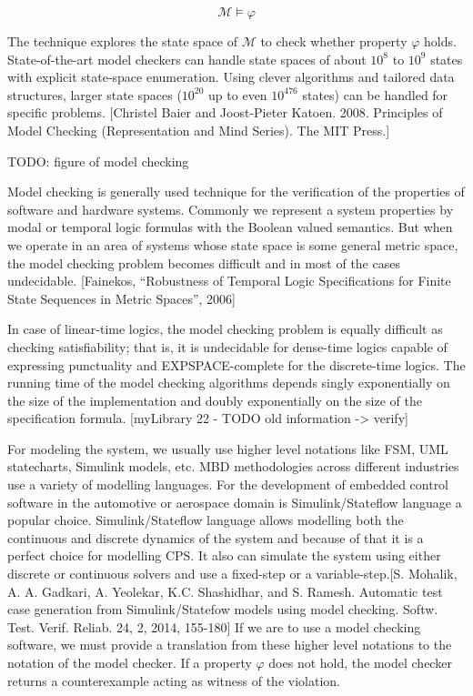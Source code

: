 \begin{equation}
	\mathcal{M} \models \varphi
\end{equation}

The technique explores the state space of $\mathcal{M}$ to check whether property $\varphi$ holds. State-of-the-art model checkers can handle state spaces of about $10^8$ to $10^9$ states with explicit state-space enumeration. Using clever algorithms and tailored data structures, larger state spaces ($10^{20}$ up to even $10^{476}$ states) can be handled for specific problems. [Christel Baier and Joost-Pieter Katoen. 2008. Principles of Model Checking (Representation and Mind Series). The MIT Press.]

TODO: figure of model checking

Model checking is generally used technique for the verification of the properties of software and hardware systems. Commonly we represent a system properties by modal or temporal logic formulas with the Boolean valued semantics. But when we operate in an area of systems whose state space is some general metric space, the model checking problem becomes difficult and in most of the cases undecidable. [Fainekos, “Robustness of Temporal Logic Specifications for Finite State Sequences in Metric Spaces”, 2006]

In case of linear-time logics, the model checking problem is equally difficult as checking satisfiability; that is, it is undecidable for dense-time logics capable of expressing punctuality and EXPSPACE-complete for the discrete-time logics. The running time of the model checking algorithms depends singly exponentially on the size of the implementation and doubly exponentially on the size of the specification formula. [myLibrary 22 - TODO old information -> verify]

For modeling the system, we usually use higher level notations like FSM, UML statecharts, Simulink models, etc. MBD methodologies across different industries use a variety of modelling languages. For the development of embedded control software in the automotive or aerospace domain is Simulink/Stateflow language a popular choice. Simulink/Stateflow language allows modelling both the continuous and discrete dynamics of the system and because of that it is a perfect choice for modelling CPS. It also can simulate the system using either discrete or continuous solvers and use a fixed-step or a variable-step.[S. Mohalik, A. A. Gadkari, A. Yeolekar, K.C. Shashidhar, and S. Ramesh. Automatic test case generation from Simulink/Statefow models using model checking. Softw. Test. Verif. Reliab. 24, 2, 2014, 155-180] If we are to use a model checking software, we must provide a translation from these higher level notations to the notation of the model checker. If a property $\varphi$ does not hold, the model checker returns a counterexample acting as witness of the violation.


